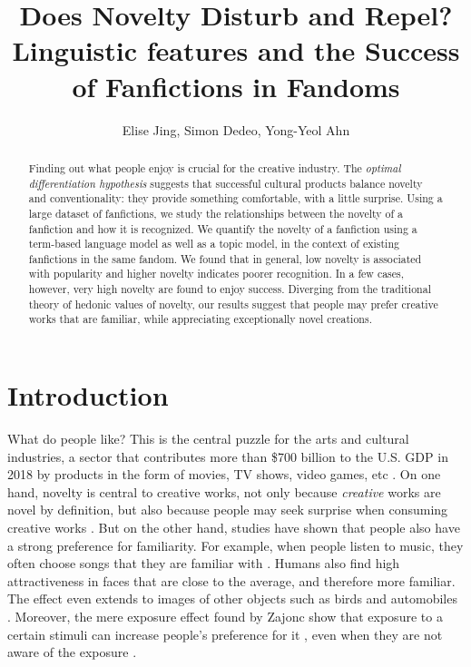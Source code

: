 \documentclass[letterpaper]{article} %
\begin{document}
%
\title{Does Novelty Disturb and Repel? Linguistic features and the Success of Fanfictions in Fandoms}
\author{Elise Jing, Simon Dedeo, Yong-Yeol Ahn\\
}
\maketitle
\begin{abstract}
Finding out what people enjoy is crucial for the creative industry. The \emph{optimal differentiation hypothesis} suggests that successful cultural products balance novelty and conventionality: they provide something comfortable, with a little surprise. Using a large dataset of fanfictions, we study the relationships between the   novelty of a fanfiction and how it is recognized. We quantify the novelty of a fanfiction using a term-based language model as well as a topic model, in the context of existing fanfictions in the same fandom. We found that in general, low novelty is associated with popularity and higher novelty indicates poorer recognition. In a few cases, however, very high novelty are found to enjoy success. Diverging from the traditional theory of hedonic values of novelty, our results suggest that people may prefer creative works that are familiar, while appreciating exceptionally novel creations.
\end{abstract}

\section*{Introduction}
\noindent 
What do people like? This is the central puzzle for the arts and cultural industries, a sector that contributes more than \$700 billion to the U.S. GDP in 2018 by products in the form of movies, TV shows, video games, etc \cite{artsculturalindustries}. On one hand, novelty is central to creative works, not only because \emph{creative} works are novel by definition, but also because people may seek surprise when consuming creative works \cite{hutter2011infinite}. But on the other hand, studies have shown that people also have a strong preference for familiarity. For example, when people listen to music, they often choose songs that they are familiar with \cite{thompson2014shazam}. Humans also find high attractiveness in faces that are close to the average, and therefore more familiar. 
The effect even extends to images of other objects such as birds and automobiles \cite{Halberstadt2003}. Moreover, the mere exposure effect found by Zajonc show that exposure to a certain stimuli can increase people's preference for it \cite{zajonc1968attitudinal}, even when they are not aware of the exposure \cite{kunst1980affective} \cite{bornstein1989exposure}. 
\end{document}
